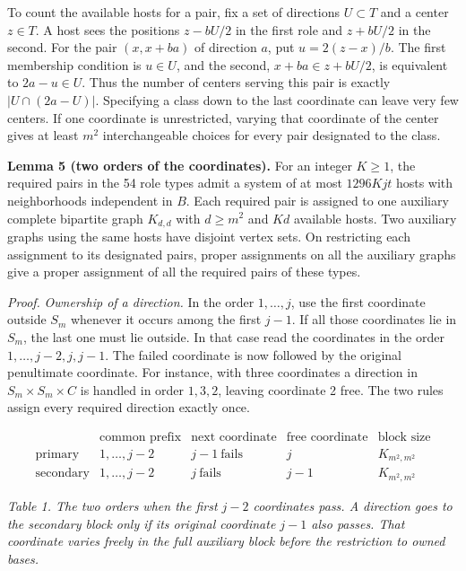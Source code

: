 \documentclass[english,11pt,a4paper]{article}
\begin{document}
To count the available hosts for a pair, fix a set of directions \(U\subset T\) and a center \(z\in T\). A host sees the positions \(z-bU/2\) in the first role and \(z+bU/2\) in the second. For the pair \((x,x+ba)\) of direction \(a\), put \(u=2(z-x)/b\). The first membership condition is \(u\in U\), and the second, \(x+ba\in z+bU/2\), is equivalent to \(2a-u\in U\). Thus the number of centers serving this pair is exactly \(|U\cap(2a-U)|\). Specifying a class down to the last coordinate can leave very few centers. If one coordinate is unrestricted, varying that coordinate of the center gives at least \(m^2\) interchangeable choices for every pair designated to the class.

\textbf{Lemma 5 (two orders of the coordinates).} For an integer \(K\ge1\), the required pairs in the 54 role types admit a system of at most \(1296Kjt\) hosts with neighborhoods independent in \(B\). Each required pair is assigned to one auxiliary complete bipartite graph \(K_{d,d}\) with \(d\ge m^2\) and \(Kd\) available hosts. Two auxiliary graphs using the same hosts have disjoint vertex sets. On restricting each assignment to its designated pairs, proper assignments on all the auxiliary graphs give a proper assignment of all the required pairs of these types.

\emph{Proof.} \emph{Ownership of a direction.} In the order \(1,\ldots,j\), use the first coordinate outside \(S_m\) whenever it occurs among the first \(j-1\). If all those coordinates lie in \(S_m\), the last one must lie outside. In that case read the coordinates in the order \(1,\ldots,j-2,j,j-1\). The failed coordinate is now followed by the original penultimate coordinate. For instance, with three coordinates a direction in \(S_m\times S_m\times C\) is handled in order \(1,3,2\), leaving coordinate 2 free. The two rules assign every required direction exactly once.

\[\begin{array}{c|ccc|c}
 &\text{common prefix}&\text{next coordinate}&\text{free coordinate}&\text{block size}\\ \hline
 \text{primary}&1,\ldots,j-2&j-1\ \text{fails}&j&K_{m^2,m^2}\\
 \text{secondary}&1,\ldots,j-2&j\ \text{fails}&j-1&K_{m^2,m^2}
\end{array}\]

\emph{Table 1. The two orders when the first \(j-2\) coordinates pass. A direction goes to the secondary block only if its original coordinate \(j-1\) also passes. That coordinate varies freely in the full auxiliary block before the restriction to owned bases.}
\end{document}

